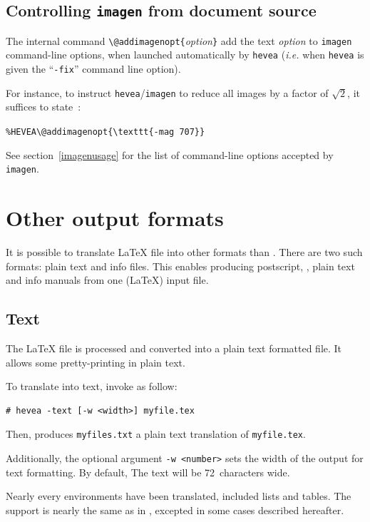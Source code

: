 \subsection{Controlling\label{imagen-source} \texttt{imagen} from document source}
The internal command
\verb+\@addimagenopt{+\textit{option}\verb+}+ add
the text \textit{option} to \texttt{imagen} command-line options, when
launched automatically by \texttt{hevea} (\emph{i.e.} when
\texttt{hevea} is given the ``\texttt{-fix}'' command line option).

For instance, to instruct \texttt{hevea}/\texttt{imagen} to
reduce all images by a factor of $\sqrt{2}$, it suffices to state~:
\begin{flushleft}
\texttt{\%HEVEA}\verb+\@addimagenopt{\texttt{-mag 707}}+
\end{flushleft}
See section~\ref{imagenusage} for the list of command-line options
accepted by \texttt{imagen}.

\section{Other \label{alternative}output formats}
It is possible to translate \LaTeX{} file into other formats than
\html. There are two such formats: plain text and info files.
This enables producing postscript,
\html, plain text and info manuals from one (\LaTeX) input file.

\subsection{Text}
The \LaTeX{} file is processed and converted into a plain text
formatted file. It allows some pretty-printing in plain text.

To translate into text, invoke \hevea{} as follow:
\begin{verbatim}
# hevea -text [-w <width>] myfile.tex
\end{verbatim}
Then, \hevea{} produces \texttt{myfiles.txt} a plain text translation
of \texttt{myfile.tex}.

Additionally, the optional argument \texttt{-w <number>} sets the
width of the output for text formatting. By default, The text will be
72~characters wide.

Nearly every environments have been translated, included lists and tables.
The support is nearly the same as in \html, excepted in some cases
described hereafter.

